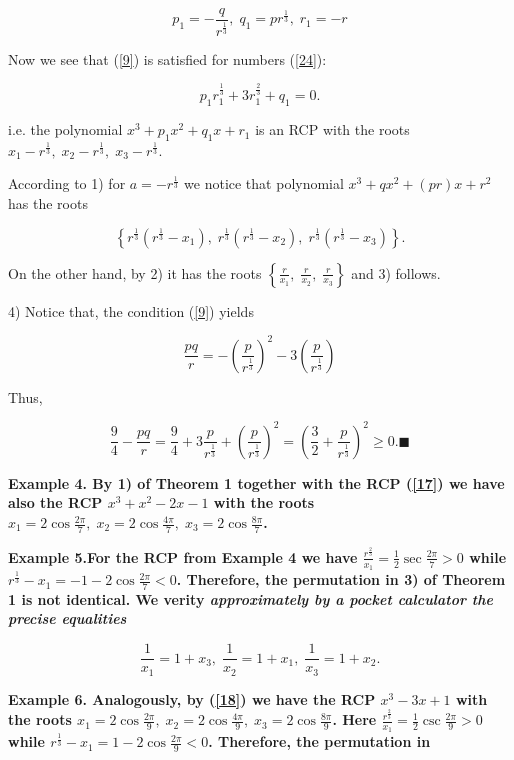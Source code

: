 \documentclass[12pt,oneside,english]{amsart}
\begin{document}
\begin{equation}\label{24}
p_1=-\frac{q}{r^{\frac 1 3}},\; q_1=pr^{\frac 1 3}, \; r_1=-r
\end{equation}

Now we see that (\ref{9}) is satisfied for numbers (\ref{24}):

$$
p_1r_1^{\frac 1 3}+3r_1^{\frac 2 3}+q_1=0.
$$

i.e. the polynomial $x^3+p_1x^2+q_1x+r_1$ is an RCP with the roots
$x_1-r^{\frac 1 3}, \; x_2-r^{\frac 1 3}, \; x_3-r^{\frac 1 3}$.

According to 1) for $a=-r^{\frac 1 3}$ we notice that polynomial
$x^3+qx^2+(pr)x+r^2$ has the roots

$$
\left\{ r^{\frac 1 3}(r^{\frac 1 3}-x_1),\; r^{\frac 1 3}(r^{\frac 1
3}-x_2), \; r^{\frac 1 3}(r^{\frac 1 3}-x_3)\right\}.
$$

On the other hand, by 2) it has the roots $ \left\{\frac
{r}{x_1},\;\frac{r}{x_2},\; \frac{r}{x_3}\right\}$  and 3) follows.


\newpage

4) Notice that, the condition (\ref{9}) yields

\begin{equation}\label{25}
\frac{pq}{r}=-\left(\frac{p}{r^{\frac 1
3}}\right)^2-3\left(\frac{p}{r^{\frac 1 3}}\right)
\end{equation}

Thus,

$$
\frac 9 4 -\frac{pq}{r}=\frac 9 4 +3\frac{p}{r^{\frac 1
3}}+\left(\frac{p}{r^{\frac 1 3}}\right)^2=\left(\frac 3 2+
\frac{p}{r^{\frac 1 3}}\right)^2\geq 0.\blacksquare
$$


\bfseries Example 4. \mdseries By  1) of Theorem 1 together with the
RCP (\ref{17}) we have also the RCP $x^3+x^2-2x-1$ with the roots
$x_1=2\cos\frac{2\pi}{7}, \;x_2=2\cos\frac{4\pi}{7},
\;x_3=2\cos\frac{8\pi}{7}$.


\bfseries Example 5.\mdseries  For the RCP from Example 4  we have
$\frac{r^{\frac 2 3}}{x_1}=\frac 1 2 \sec\frac{2\pi}{7}> 0$ while
$r^{\frac 1 3}-x_1=-1-2\cos\frac{2\pi}{7}< 0$. Therefore, the
permutation in 3) of Theorem 1 is not identical. We verity \slshape
approximately \upshape by a pocket calculator the precise equalities

$$
\frac{1}{x_1}=1+x_3, \; \frac{1}{x_2}=1+x_1, \; \frac{1}{x_3}=1+x_2.
$$


\bfseries Example 6. \mdseries Analogously, by (\ref{18}) we have
the RCP $x^3-3x+1$ with the roots $x_1=2\cos\frac{2\pi}{9}, \;
x_2=2\cos\frac{4\pi}{9}, \; x_3=2\cos\frac{8\pi}{9}$. Here
$\frac{r^{\frac 2 3}}{x_1}=\frac 1 2\csc\frac{2\pi}{9}> 0$ while
$r^{\frac 1 3}-x_1=1-2\cos\frac{2\pi}{9}< 0$. Therefore, the
permutation in
\end{document}
